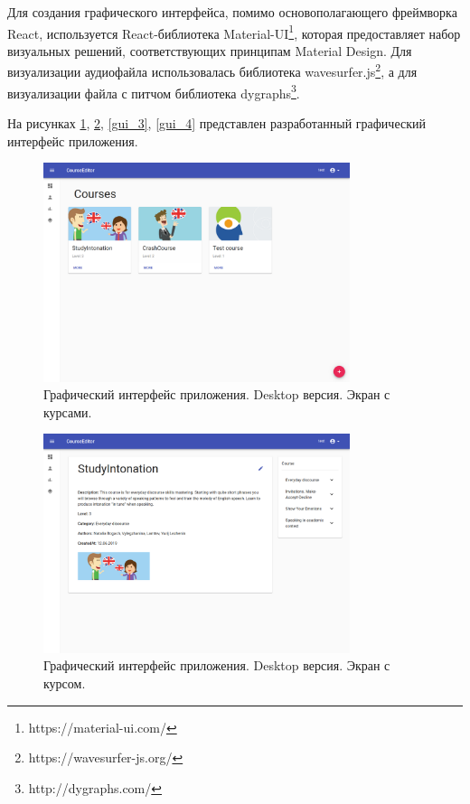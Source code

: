 \documentclass[%
  a5paper,
  subf,
  href,
  master,
  dotsinheaders 
]{csse-fcs}
\begin{document}
Для создания графического интерфейса, помимо основополагающего фреймворка React, используется React-библиотека Material-UI\footnote{https://material-ui.com/}, которая предоставляет набор визуальных решений, соответствующих принципам Material Design. Для визуализации аудиофайла использовалась библиотека wavesurfer.js\footnote{https://wavesurfer-js.org/}, а для визуализации файла с питчом библиотека dygraphs\footnote{http://dygraphs.com/}.

На рисунках \ref{gui_1}, \ref{gui_2}, \ref{gui_3}, \ref{gui_4} представлен разработанный графический интерфейс приложения.

\newpage

\begin{figure}[H]
\includegraphics[width=0.8\textwidth]{img/5.png}
\captionsetup{justification=justified}
\caption{Графический интерфейс приложения. Desktop версия. Экран с курсами.}
\label{gui_1}
\end{figure}

\begin{figure}[H]
\includegraphics[width=0.8\textwidth]{img/6.png}
\captionsetup{justification=justified}
\caption{Графический интерфейс приложения. Desktop версия. Экран с курсом.}
\label{gui_2}
\end{figure}
 
\end{document}
